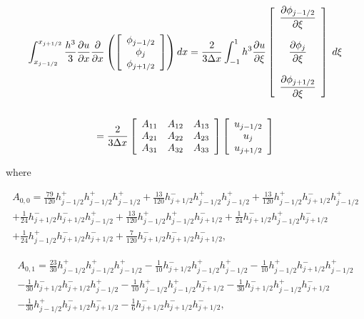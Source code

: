 \documentclass[12pt]{article}
\begin{document}
\begin{multline*}
\int_{x_{j-1/2}}^{x_{j+1/2}}\frac{h^3}{3} \frac{\partial u}{\partial x} \frac{\partial}{\partial x} \left(\left[\begin{array}{c}\phi_{j-1/2} \\\phi_{j}\\\phi_{j+1/2} \end{array}\right] \right) dx = \frac{2}{3\Delta x} \int_{-1}^{1}h^3 \frac{\partial u}{\partial \xi}  \left[\begin{array}{c} \dfrac{\partial \phi_{j-1/2} }{\partial \xi}\\ \\ \dfrac{\partial \phi_{j} }{\partial \xi}\\ \\\dfrac{\partial \phi_{j+1/2} }{\partial \xi} \end{array}\right] \; d\xi \\ \\ =
 \frac{2}{3\Delta x} \left[\begin{array}{c c c } 
A_{11} & A_{12}  & A_{13}\\
A_{21} & A_{22}  & A_{23}\\
A_{31} & A_{32}  & A_{33}\\
\end{array}\right] \left[\begin{array}{c}u_{j-1/2} \\u_{j}\\u_{j+1/2} \end{array}\right]
\end{multline*}

where
 
\begin{multline*} A_{0,0} = \frac{79}{120} h_{j-1/2}^+ h_{j-1/2}^+ h_{j-1/2}^++\frac{13}{120} h_{j+1/2}^- h_{j-1/2}^+ h_{j-1/2}^++\frac{13}{120} h_{j-1/2}^+ h_{j+1/2}^- h_{j-1/2}^+\\+\frac{1}{24} h_{j+1/2}^- h_{j+1/2}^- h_{j-1/2}^++\frac{13}{120} h_{j-1/2}^+ h_{j-1/2}^+ h_{j+1/2}^-+\frac{1}{24} h_{j+1/2}^- h_{j-1/2}^+ h_{j+1/2}^-\\+\frac{1}{24} h_{j-1/2}^+ h_{j+1/2}^- h_{j+1/2}^-+\frac{7}{120} h_{j+1/2}^- h_{j+1/2}^- h_{j+1/2}^-, \end{multline*}

\begin{multline*} A_{0,1} = \frac{23}{30} h_{j-1/2}^+ h_{j-1/2}^+ h_{j-1/2}^+-\frac{1}{10} h_{j+1/2}^- h_{j-1/2}^+ h_{j-1/2}^+-\frac{1}{10} h_{j-1/2}^+ h_{j+1/2}^- h_{j-1/2}^+\\-\frac{1}{30} h_{j+1/2}^- h_{j+1/2}^- h_{j-1/2}^+-\frac{1}{10} h_{j-1/2}^+ h_{j-1/2}^+ h_{j+1/2}^--\frac{1}{30} h_{j+1/2}^- h_{j-1/2}^+ h_{j+1/2}^-\\-\frac{1}{30} h_{j-1/2}^+ h_{j+1/2}^- h_{j+1/2}^--\frac{1}{6} h_{j+1/2}^- h_{j+1/2}^- h_{j+1/2}^-, \end{multline*}
\end{document}
